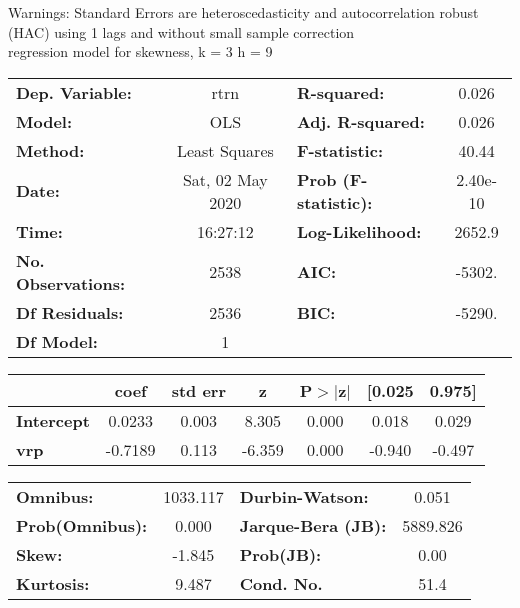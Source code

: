 Warnings: \newline
 [1] Standard Errors are heteroscedasticity and autocorrelation robust (HAC) using 1 lags and without small sample correction\\ 

regression model for skewness, k = 3 h = 9\begin{center}
\begin{tabular}{lclc}
\toprule
\textbf{Dep. Variable:}    &       rtrn       & \textbf{  R-squared:         } &     0.026   \\
\textbf{Model:}            &       OLS        & \textbf{  Adj. R-squared:    } &     0.026   \\
\textbf{Method:}           &  Least Squares   & \textbf{  F-statistic:       } &     40.44   \\
\textbf{Date:}             & Sat, 02 May 2020 & \textbf{  Prob (F-statistic):} &  2.40e-10   \\
\textbf{Time:}             &     16:27:12     & \textbf{  Log-Likelihood:    } &    2652.9   \\
\textbf{No. Observations:} &        2538      & \textbf{  AIC:               } &    -5302.   \\
\textbf{Df Residuals:}     &        2536      & \textbf{  BIC:               } &    -5290.   \\
\textbf{Df Model:}         &           1      & \textbf{                     } &             \\
\bottomrule
\end{tabular}
\begin{tabular}{lcccccc}
                   & \textbf{coef} & \textbf{std err} & \textbf{z} & \textbf{P$> |$z$|$} & \textbf{[0.025} & \textbf{0.975]}  \\
\midrule
\textbf{Intercept} &       0.0233  &        0.003     &     8.305  &         0.000        &        0.018    &        0.029     \\
\textbf{vrp}       &      -0.7189  &        0.113     &    -6.359  &         0.000        &       -0.940    &       -0.497     \\
\bottomrule
\end{tabular}
\begin{tabular}{lclc}
\textbf{Omnibus:}       & 1033.117 & \textbf{  Durbin-Watson:     } &    0.051  \\
\textbf{Prob(Omnibus):} &   0.000  & \textbf{  Jarque-Bera (JB):  } & 5889.826  \\
\textbf{Skew:}          &  -1.845  & \textbf{  Prob(JB):          } &     0.00  \\
\textbf{Kurtosis:}      &   9.487  & \textbf{  Cond. No.          } &     51.4  \\
\bottomrule
\end{tabular}
\end{center}

